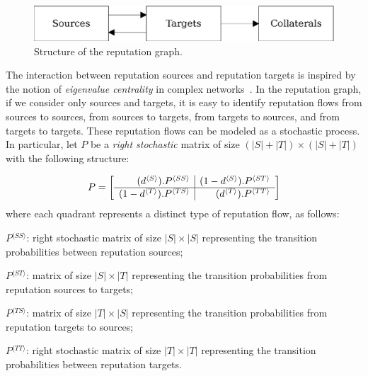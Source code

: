 \documentclass[notitlepage]{svjour3}
\begin{document}
\begin{figure}[h]
   \centerline{\includegraphics[scale=0.6]{figures/overview-line}}
   \caption{Structure of the reputation graph.}
   \label{fig:overview}
\end{figure}

The interaction between reputation sources and reputation targets is inspired by the 
notion of {\em eigenvalue centrality} in complex 
networks~\cite{Brin1998,Langville2008,Langville2008,Newman2010}. 
In the reputation graph, if we consider only sources and targets, it is easy to 
identify reputation flows from sources to sources, from sources to targets, from 
targets to sources, and from targets to targets. These reputation flows can be 
modeled as a stochastic process. 
In particular, let $P$ be a \emph{right stochastic} %
matrix of size $(|S|+|T|) \times (|S|+|T|)$ with the following structure: 

\newcommand{\bkt}[1]{ {^{\langle #1 \rangle}} }

\begin{align}\label{eq:newp}
P =
\left[
\begin{array}{r | r}
(d\bkt{S}) . P\bkt{SS}  & (1-d\bkt{S}) . P\bkt{ST} \\
\hline
(1-d\bkt{T}) . P\bkt{TS}  & (d\bkt{T}) . P\bkt{TT} \\
\end{array}
\right]
\end{align}
\noindent where each quadrant represents a distinct type of reputation flow, as follows: 

\begin{description}
\item $P\bkt{SS}$: right stochastic matrix of size $|S|\times |S|$ representing the 
transition probabilities between reputation sources;
\item $P\bkt{ST}$: matrix of size $|S|\times |T|$ representing the transition probabilities from reputation sources to targets;
\item $P\bkt{TS}$: matrix of size $|T|\times |S|$ representing the transition probabilities from reputation targets to sources;
\item $P\bkt{TT}$: right stochastic matrix of size $|T|\times |T|$ representing the transition probabilities between reputation targets.
\end{description}
\end{document}
